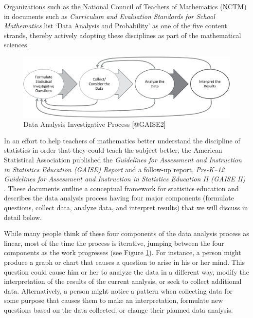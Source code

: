 \documentclass[
]{book}
\theoremstyle{definition}
\theoremstyle{definition}
\theoremstyle{definition}
\theoremstyle{definition}
\theoremstyle{remark}
\begin{document}
Organizations such as the National Council of Teachers of Mathematics (NCTM) in documents such as \emph{Curriculum and Evaluation Standards for School Mathematics} \citep{NCTM1989} list `Data Analysis and Probability' as one of the five content strands, thereby actively adopting these disciplines as part of the mathematical sciences.

\begin{figure}

{\centering \includegraphics[width=0.9\linewidth]{tikz/GAISE3} 

}

\caption{Data Analysis Investigative Process [@GAISE2]}\label{fig:gaise-process}
\end{figure}

In an effort to help teachers of mathematics better understand the discipline of statistics in order that they could teach the subject better, the American Statistical Association published the \emph{Guidelines for Assessment and Instruction in Statistics Education (GAISE) Report} \citep{GAISE} and a follow-up report, \emph{Pre-K--12 Guidelines for Assessment and Instruction in Statistics Education II (GAISE II)} \citep{GAISE2}. These documents outline a conceptual framework for statistics education and describes the data analysis process having four major components (formulate questions, collect data, analyze data, and interpret results) that we will discuss in detail below.

While many people think of these four components of the data analysis process as linear, most of the time the process is iterative, jumping between the four components as the work progresses (see Figure \ref{fig:gaise-process}).
For instance, a person might produce a graph or chart that causes a question to arise in his or her mind. This question could cause him or her to analyze the data in a different way, modify the interpretation of the results of the current analysis, or seek to collect additional data. Alternatively, a person might notice a pattern when collecting data for some purpose that causes them to make an interpretation, formulate new questions based on the data collected, or change their planned data analysis.
\end{document}
